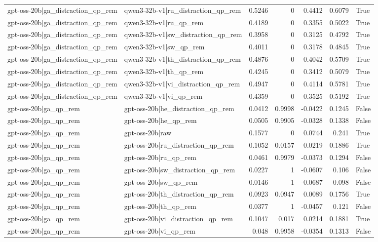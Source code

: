 \begin{table}
\begin{tabular}{l l r r r r l}
gpt-oss-20b|ga_distraction_qp_rem & qwen3-32b-v1|ru_distraction_qp_rem & 0.5246 & 0 & 0.4412 & 0.6079 & True \\
gpt-oss-20b|ga_distraction_qp_rem & qwen3-32b-v1|ru_qp_rem & 0.4189 & 0 & 0.3355 & 0.5022 & True \\
gpt-oss-20b|ga_distraction_qp_rem & qwen3-32b-v1|sw_distraction_qp_rem & 0.3958 & 0 & 0.3125 & 0.4792 & True \\
gpt-oss-20b|ga_distraction_qp_rem & qwen3-32b-v1|sw_qp_rem & 0.4011 & 0 & 0.3178 & 0.4845 & True \\
gpt-oss-20b|ga_distraction_qp_rem & qwen3-32b-v1|th_distraction_qp_rem & 0.4876 & 0 & 0.4042 & 0.5709 & True \\
gpt-oss-20b|ga_distraction_qp_rem & qwen3-32b-v1|th_qp_rem & 0.4245 & 0 & 0.3412 & 0.5079 & True \\
gpt-oss-20b|ga_distraction_qp_rem & qwen3-32b-v1|vi_distraction_qp_rem & 0.4947 & 0 & 0.4114 & 0.5781 & True \\
gpt-oss-20b|ga_distraction_qp_rem & qwen3-32b-v1|vi_qp_rem & 0.4359 & 0 & 0.3525 & 0.5192 & True \\
gpt-oss-20b|ga_qp_rem & gpt-oss-20b|he_distraction_qp_rem & 0.0412 & 0.9998 & -0.0422 & 0.1245 & False \\
gpt-oss-20b|ga_qp_rem & gpt-oss-20b|he_qp_rem & 0.0505 & 0.9905 & -0.0328 & 0.1338 & False \\
gpt-oss-20b|ga_qp_rem & gpt-oss-20b|raw & 0.1577 & 0 & 0.0744 & 0.241 & True \\
gpt-oss-20b|ga_qp_rem & gpt-oss-20b|ru_distraction_qp_rem & 0.1052 & 0.0157 & 0.0219 & 0.1886 & True \\
gpt-oss-20b|ga_qp_rem & gpt-oss-20b|ru_qp_rem & 0.0461 & 0.9979 & -0.0373 & 0.1294 & False \\
gpt-oss-20b|ga_qp_rem & gpt-oss-20b|sw_distraction_qp_rem & 0.0227 & 1 & -0.0607 & 0.106 & False \\
gpt-oss-20b|ga_qp_rem & gpt-oss-20b|sw_qp_rem & 0.0146 & 1 & -0.0687 & 0.098 & False \\
gpt-oss-20b|ga_qp_rem & gpt-oss-20b|th_distraction_qp_rem & 0.0923 & 0.0947 & 0.0089 & 0.1756 & True \\
gpt-oss-20b|ga_qp_rem & gpt-oss-20b|th_qp_rem & 0.0377 & 1 & -0.0457 & 0.121 & False \\
gpt-oss-20b|ga_qp_rem & gpt-oss-20b|vi_distraction_qp_rem & 0.1047 & 0.017 & 0.0214 & 0.1881 & True \\
gpt-oss-20b|ga_qp_rem & gpt-oss-20b|vi_qp_rem & 0.048 & 0.9958 & -0.0354 & 0.1313 & False \\

\end{tabular}
\end{table}
